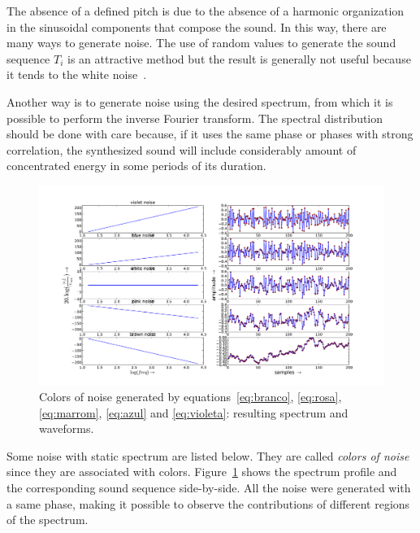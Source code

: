 \documentclass[
 aip,
 jmp,
 amsmath,amssymb,
 reprint,
]{revtex4-1}
\begin{document}
The absence of a defined pitch is due to the absence of a harmonic organization in the sinusoidal components that compose the sound.
In this way, there are many ways to generate noise.
The use of random values to generate the sound sequence $T_i$ is an attractive method but the result is generally not useful because it tends to the white noise~\cite{Cook}.

Another way is to generate noise using the desired spectrum, from which it is possible to perform the inverse Fourier transform.
The spectral distribution should be done with care because, if it uses the same phase or phases with strong correlation, the synthesized sound will include considerably amount of concentrated energy in some periods of its duration.

\begin{figure}[htpq!]
     \centering
         \includegraphics[width=\columnwidth]{figures/ruidos}
     \caption{Colors of noise generated by equations~\ref{eq:branco}, \ref{eq:rosa}, \ref{eq:marrom}, \ref{eq:azul} and \ref{eq:violeta}: resulting spectrum and waveforms.}
         \label{fig:ruidos}
\end{figure}

Some noise with static spectrum are listed below. They are called \emph{colors of noise} since they are associated with colors.
Figure~\ref{fig:ruidos} shows the spectrum profile and the corresponding sound sequence side-by-side. All the noise were generated with a same phase, making it possible to observe the contributions of different regions of the spectrum.
\end{document}
